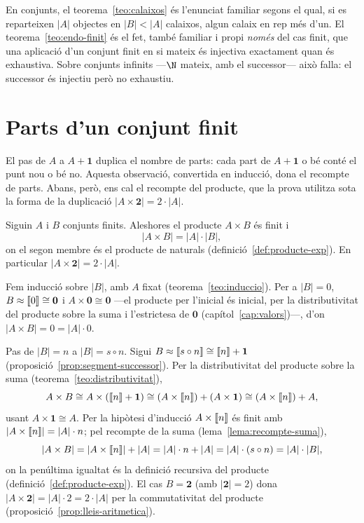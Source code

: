 \begin{observacio}\label{obs:calaixos-classica}
En conjunts, el teorema~\ref{teo:calaixos} és l'enunciat familiar segons
el qual, si es reparteixen \(|A|\) objectes en \(|B|<|A|\) calaixos, algun
calaix en rep més d'un. El teorema~\ref{teo:endo-finit} és el fet, també
familiar i propi \emph{només} del cas finit, que una aplicació d'un
conjunt finit en si mateix és injectiva exactament quan és exhaustiva.
Sobre conjunts infinits ---\(\N\) mateix, amb el successor--- això falla:
el successor és injectiu però no exhaustiu.
\end{observacio}

\section{Parts d'un conjunt finit}\label{sec:parts-finites}

El pas de \(A\) a \(A+\mathbf1\) duplica el nombre de parts: cada part de
\(A+\mathbf1\) o bé conté el punt nou o bé no. Aquesta observació,
convertida en inducció, dona el recompte de parts. Abans, però, ens cal el
recompte del producte, que la prova utilitza sota la forma de la
duplicació \(|A\times\mathbf2|=2\cdot|A|\).

\begin{lema}\label{lema:recompte-producte}
Siguin \(A\) i \(B\) conjunts finits. Aleshores el producte \(A\times B\)
és finit i
\[
|A\times B|=|A|\cdot|B|,
\]
on el segon membre és el producte de naturals
(definició~\ref{def:producte-exp}). En particular
\(|A\times\mathbf2|=2\cdot|A|\).
\end{lema}

\begin{prova}
Fem inducció sobre \(|B|\), amb \(A\) fixat (teorema~\ref{teo:induccio}).
Per a \(|B|=0\), \(B\approx\llbracket 0\rrbracket\cong\mathbf0\) i
\(A\times\mathbf0\cong\mathbf0\) ---el producte per l'inicial és inicial,
per la distributivitat del producte sobre la suma i l'estrictesa de
\(\mathbf0\) (capítol~\ref{cap:valors})---, d'on \(|A\times B|=0=|A|\cdot0\).

Pas de \(|B|=n\) a \(|B|=s\circ n\). Sigui \(B\approx\llbracket s\circ
n\rrbracket\cong\llbracket n\rrbracket+\mathbf1\) (proposició~\ref{prop:segment-successor}). Per la
distributivitat del producte sobre la suma
(teorema~\ref{teo:distributivitat}),
\[
A\times B\cong A\times(\llbracket n\rrbracket+\mathbf1)\cong (A\times\llbracket n\rrbracket)+(A\times\mathbf1)
\cong (A\times\llbracket n\rrbracket)+A,
\]
usant \(A\times\mathbf1\cong A\). Per la hipòtesi d'inducció
\(A\times\llbracket n\rrbracket\) és finit amb \(|A\times\llbracket n\rrbracket|=|A|\cdot n\); pel
recompte de la suma (lema~\ref{lema:recompte-suma}),
\[
|A\times B|=|A\times\llbracket n\rrbracket|+|A|=|A|\cdot n+|A|=|A|\cdot(s\circ n)=|A|\cdot|B|,
\]
on la penúltima igualtat és la definició recursiva del producte
(definició~\ref{def:producte-exp}). El cas \(B=\mathbf2\) (amb
\(|\mathbf2|=2\)) dona \(|A\times\mathbf2|=|A|\cdot2=2\cdot|A|\) per la
commutativitat del producte (proposició~\ref{prop:lleis-aritmetica}).
\end{prova}

